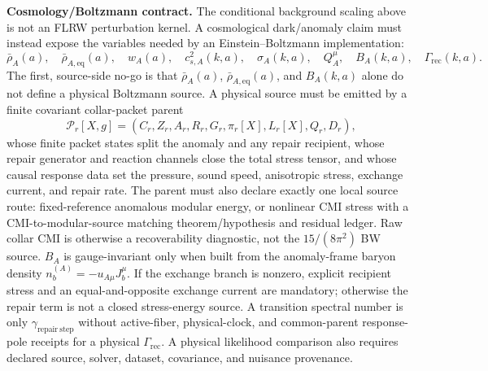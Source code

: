 \textbf{Cosmology/Boltzmann contract.}
The conditional background scaling above is not an FLRW perturbation kernel. A cosmological dark/anomaly
claim must instead expose the variables needed by an Einstein--Boltzmann implementation:
\[
  \bar\rho_A(a),\quad
  \bar\rho_{A,\mathrm{eq}}(a),\quad
  w_A(a),\quad
  c_{s,A}^2(k,a),\quad
  \sigma_A(k,a),\quad
  Q_A^\mu,\quad
  B_A(k,a),\quad
  \Gamma_{\mathrm{rec}}(k,a).
\]
The first, source-side no-go is that
\(\bar\rho_A(a)\), \(\bar\rho_{A,\mathrm{eq}}(a)\), and \(B_A(k,a)\) alone do
not define a physical Boltzmann source.  A physical source must be emitted by a
finite covariant collar-packet parent
\[
\mathcal P_r[X,g]=(C_r,Z_r,A_r,R_r,G_r,\pi_r[X],L_r[X],Q_r,D_r),
\]
whose finite packet states split the anomaly and any repair recipient, whose
repair generator and reaction channels close the total stress tensor, and whose
causal response data set the pressure, sound speed, anisotropic stress, exchange
current, and repair rate.  The parent must also declare exactly one local source
route: fixed-reference anomalous modular energy, or nonlinear CMI stress with a
CMI-to-modular-source matching theorem/hypothesis and residual ledger. Raw
collar CMI is otherwise a recoverability diagnostic, not the \(15/(8\pi^2)\)
BW source. \(B_A\) is gauge-invariant only when built from the
anomaly-frame baryon density \(n_b^{(A)}=-u_{A\mu}J_b^\mu\).  If the exchange
branch is nonzero, explicit recipient stress and an equal-and-opposite exchange
current are mandatory; otherwise the repair term is not a closed stress-energy
source. A transition spectral number is only \(\gamma_{\mathrm{repair\ step}}\)
without active-fiber, physical-clock, and common-parent response-pole receipts for
a physical \(\Gamma_{\mathrm{rec}}\). A physical likelihood comparison also
requires declared source, solver, dataset, covariance, and nuisance provenance.



